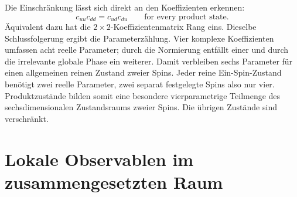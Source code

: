 Die Einschränkung lässt sich direkt an den Koeffizienten erkennen:
\begin{equation}
c_{uu}c_{dd}=c_{ud}c_{du}
\qquad\text{for every product state}.
\label{eq:l6-rank-one-condition}
\end{equation}
Äquivalent dazu hat die \(2\times2\)-Koeffizientenmatrix Rang eins. Dieselbe Schlussfolgerung ergibt die Parameterzählung. Vier komplexe Koeffizienten umfassen acht reelle Parameter; durch die Normierung entfällt einer und durch die irrelevante globale Phase ein weiterer. Damit verbleiben sechs Parameter für einen allgemeinen reinen Zustand zweier Spins. Jeder reine Ein-Spin-Zustand benötigt zwei reelle Parameter, zwei separat festgelegte Spins also nur vier. Produktzustände bilden somit eine besondere vierparametrige Teilmenge des sechsdimensionalen Zustandsraums zweier Spins. Die übrigen Zustände sind verschränkt.

\section{Lokale Observablen im zusammengesetzten Raum}

